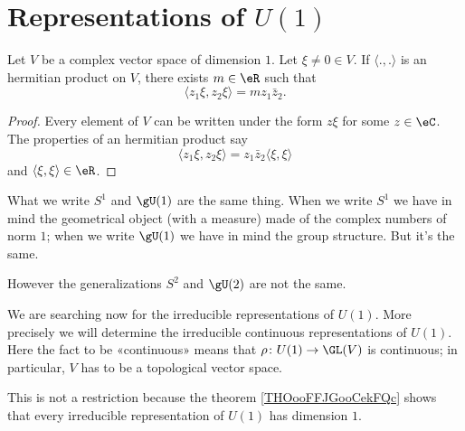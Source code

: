 \section{Representations of \texorpdfstring{$ U(1)$}{U(1)}}

\begin{proposition}
    Let \( V\) be a complex vector space of dimension \( 1\). Let \( \xi\neq 0\in V\). If \( \langle ., .\rangle \) is an hermitian product on \( V\), there exists \( m\in \eR\) such that
    \begin{equation}
        \langle z_1\xi, z_2\xi\rangle =mz_1\bar z_2.
    \end{equation}
\end{proposition}

\begin{proof}
    Every element of \( V\) can be written under the form \( z\xi\) for some \( z\in \eC\). The properties of an hermitian product say
    \begin{equation}
        \langle z_1\xi, z_2\xi\rangle =z_1\bar z_2\langle \xi, \xi\rangle 
    \end{equation}
    and \( \langle \xi, \xi\rangle \in \eR\).
\end{proof}

\begin{normaltext}
    What we write \( S^1\) and \( \gU(1)\) are the same thing. When we write \( S^1\) we have in mind the geometrical object (with a measure) made of the complex numbers of norm \( 1\); when we write \( \gU(1)\) we have in mind the group structure. But it's the same.

    However the generalizations \( S^2\) and \( \gU(2)\) are not the same.
\end{normaltext}

\begin{normaltext}
    We are searching now for the irreducible representations of \( U(1)\). More precisely we will determine the irreducible continuous representations of \( U(1)\). Here the fact to be «continuous» means that \( \rho\colon U(1)\to \GL(V)\) is continuous; in particular, \( V\) has to be a topological vector space.

    This is not a restriction because the theorem \ref{THOooFFJGooCekFQc} shows that every irreducible representation of \( U(1)\) has dimension \( 1\).
\end{normaltext}


